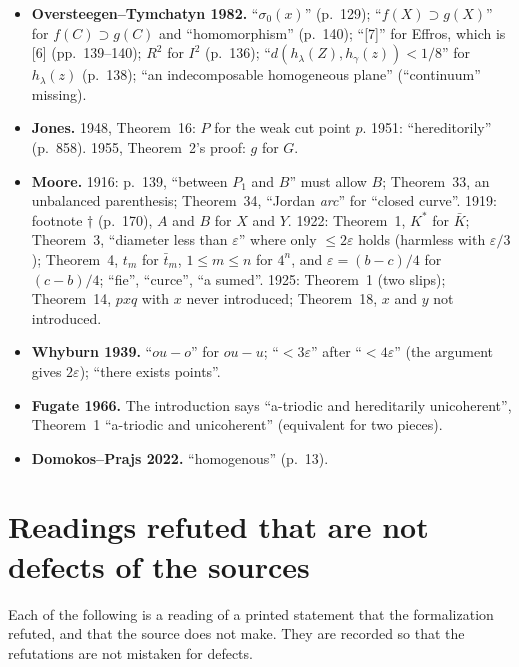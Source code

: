 \documentclass[11pt]{article}
\newcounter{defect}
\begin{document}
\begin{itemize}
  applied to unions $F\cup J$, $N\cup F$, which is harmless in the plane.
\item \textbf{Oversteegen--Tymchatyn 1982.} ``$\sigma_0(x)$'' (p.~129); ``$f(X)\supset g(X)$'' for
  $f(C)\supset g(C)$ and ``homomorphism'' (p.~140); ``[7]'' for Effros, which is [6]
  (pp.~139--140); $R^2$ for $I^2$ (p.~136); ``$d(h_\lambda(Z),h_\gamma(z))<1/8$'' for
  $h_\lambda(z)$ (p.~138); ``an indecomposable homogeneous plane'' (``continuum'' missing).
\item \textbf{Jones.} 1948, Theorem~16: $P$ for the weak cut point $p$. 1951: ``hereditorily''
  (p.~858). 1955, Theorem~2's proof: $g$ for $G$.
\item \textbf{Moore.} 1916: p.~139, ``between $P_1$ and $B$'' must allow $B$; Theorem~33, an
  unbalanced parenthesis; Theorem~34, ``Jordan \emph{arc}'' for ``closed curve''. 1919: footnote
  $\dagger$ (p.~170), $A$ and $B$ for $X$ and $Y$. 1922: Theorem~1, $K^*$ for $\bar K$; Theorem~3,
  ``diameter less than $\varepsilon$'' where only $\le2\varepsilon$ holds (harmless with
  $\varepsilon/3$); Theorem~4, $t_m$ for $\bar t_m$, $1\le m\le n$ for $4^n$, and
  $\varepsilon=(b-c)/4$ for $(c-b)/4$; ``fie'', ``curce'', ``a sumed''. 1925: Theorem~1 (two slips);
  Theorem~14, $pxq$ with $x$ never introduced; Theorem~18, $x$ and $y$ not introduced.
\item \textbf{Whyburn 1939.} ``$ou-o$'' for $ou-u$; ``$<3\varepsilon$'' after ``$<4\varepsilon$''
  (the argument gives $2\varepsilon$); ``there exists points''.
\item \textbf{Fugate 1966.} The introduction says ``a-triodic and hereditarily unicoherent'',
  Theorem~1 ``a-triodic and unicoherent'' (equivalent for two pieces).
\item \textbf{Domokos--Prajs 2022.} ``homogenous'' (p.~13).
\end{itemize}

\appendix
\section{Readings refuted that are not defects of the sources}\label{app:readings}

Each of the following is a reading of a printed statement that the formalization refuted, and that
the source does not make. They are recorded so that the refutations are not mistaken for defects.
\end{document}

